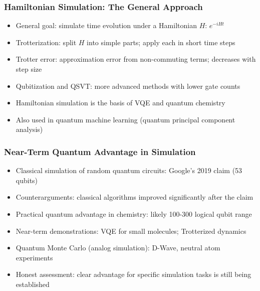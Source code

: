 \begin{frame}[fragile]\frametitle{Hamiltonian Simulation: The General Approach}
\begin{itemize}
\item General goal: simulate time evolution under a Hamiltonian $H$: $e^{-iHt}$
\item Trotterization: split $H$ into simple parts; apply each in short time steps
\item Trotter error: approximation error from non-commuting terms; decreases with step size
\item Qubitization and QSVT: more advanced methods with lower gate counts
\item Hamiltonian simulation is the basis of VQE and quantum chemistry
\item Also used in quantum machine learning (quantum principal component analysis)
\end{itemize}
\end{frame}

\begin{frame}[fragile]\frametitle{Near-Term Quantum Advantage in Simulation}
\begin{itemize}
\item Classical simulation of random quantum circuits: Google's 2019 claim (53 qubits)
\item Counterarguments: classical algorithms improved significantly after the claim
\item Practical quantum advantage in chemistry: likely 100-300 logical qubit range
\item Near-term demonstrations: VQE for small molecules; Trotterized dynamics
\item Quantum Monte Carlo (analog simulation): D-Wave, neutral atom experiments
\item Honest assessment: clear advantage for specific simulation tasks is still being established
\end{itemize}
\end{frame}

